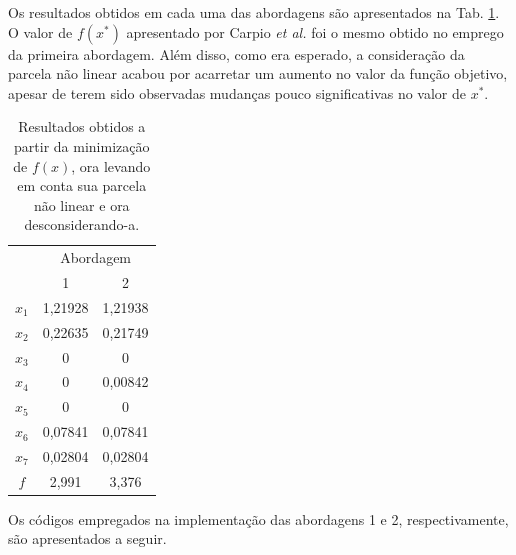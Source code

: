 \documentclass[12pt]{article}
\begin{document}
 	Os resultados obtidos em cada uma das abordagens são apresentados na Tab. \ref{resultados3}. O valor de $ f(x^*) $ apresentado por Carpio \textit{et al.} foi o mesmo obtido no emprego da primeira abordagem. Além disso, como era esperado, a consideração da parcela não linear acabou por acarretar um aumento no valor da função objetivo, apesar de terem sido observadas mudanças pouco significativas no valor de $ x^* $.
 	
 	\begin{table}[H]
 		\centering
 		\caption{Resultados obtidos a partir da minimização de $ f(x) $, ora levando em conta sua parcela não linear e ora desconsiderando-a.}
 		\label{resultados3}
 		\begin{tabular}{|c|c|c|}
 			\hline
 			\multirow{2}{*}{} & \multicolumn{2}{c|}{Abordagem} \\ \cline{2-3} 
 			& 1              & 2             \\ \hline
 			$x_1$             & 1,21928        & 1,21938       \\ \hline
 			$x_2$             & 0,22635        & 0,21749       \\ \hline
 			$x_3$             & 0              & 0             \\ \hline
 			$x_4$             & 0              & 0,00842       \\ \hline
 			$x_5$             & 0              & 0             \\ \hline
 			$x_6$             & 0,07841        & 0,07841       \\ \hline
 			$x_7$             & 0,02804        & 0,02804       \\ \hline
 			$f$               & 2,991          & 3,376         \\ \hline
 		\end{tabular}
 	\end{table}
 
 	Os códigos empregados na implementação das abordagens 1 e 2, respectivamente, são apresentados a seguir.
 	
\end{document}
